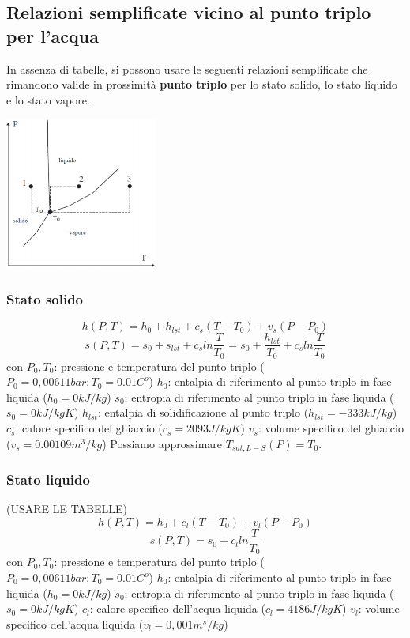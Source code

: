 \subsection{Relazioni semplificate vicino al punto triplo per l'acqua}
In assenza di tabelle, si possono usare le seguenti relazioni semplificate che rimandono valide in prossimità \textbf{punto triplo} per lo stato solido, lo stato liquido e lo stato vapore.
\begin{center}
    \includegraphics[height=5cm]{../L04/img15.PNG}
\end{center}
\subsubsection{Stato solido}
\[
    h(P,T) = h_0 + h_{lst} + c_s(T-T_0) + v_s(P-P_0)
\]
\[
    s(P,T) = s_0 +s_{lst} + c_s ln \frac{T}{T_0} = s_0 + \frac{h_{lst}}{T_0} + c_s ln \frac{T}{T_0}
\]
con \newline
$P_0, T_0$: pressione e temperatura del punto triplo ($P_0 = 0,00611 bar ; T_0 = 0.01 C^o$)\newline
$h_0$: entalpia di riferimento al punto triplo in fase liquida ($h_0 = 0 kJ/kg$)\newline
$s_0$: entropia di riferimento al punto triplo in fase liquida ($s_0 = 0kJ/kgK$)\newline
$h_{lst}$: entalpia di solidificazione al punto triplo ($h_{lst} = -333 kJ/kg$)\newline
$c_s$: calore specifico del ghiaccio ($c_s = 2093 J/kgK$)\newline
$v_s$: volume specifico del ghiaccio ($v_s = 0.00109 m^3/kg$)\newline
Possiamo approssimare $T_{sat, L-S}(P) = T_0$.
\subsubsection{Stato liquido}
(USARE LE TABELLE)
\[
    h(P,T) = h_0 + c_{l}(T-T_0) + v_l (P-P_0)
\]
\[
    s(P,T) = s_0 + c_l ln \frac{T}{T_0}
\]
con \newline
$P_0, T_0$: pressione e temperatura del punto triplo ($P_0 = 0,00611 bar ; T_0 = 0.01 C^o$)\newline
$h_0$: entalpia di riferimento al punto triplo in fase liquida ($h_0 = 0 kJ/kg$)\newline
$s_0$: entropia di riferimento al punto triplo in fase liquida ($s_0 = 0kJ/kgK$)\newline
$c_{l}$: calore specifico dell'acqua liquida ($c_l = 4186 J/kgK$)\newline
$v_{l}$: volume specifico dell'acqua liquida ($v_l = 0,001 m^s/kg$)
